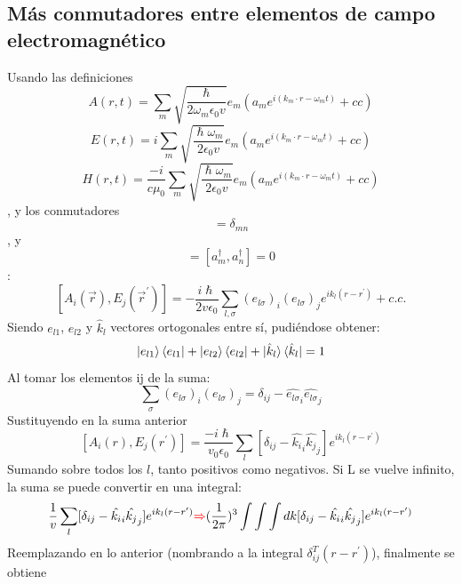 \documentclass{book}
\begin{document}
    \subsection{Más conmutadores entre elementos de campo electromagnético} Usando las definiciones 
    \begin{equation}{A(r,t)=\sum_{m}\sqrt{\frac{\hslash}{2\omega_m\epsilon_0 v}}{e}_m(a_me^{i({k}_m\cdot{r}-\omega_m t)}+cc)} \end{equation}
    \begin{equation}{E(r,t)=i\sum_{m}\sqrt{\frac{\hslash\omega_m}{2\epsilon_0 v}}{e}_m(a_me^{i({k}_m\cdot{r}-\omega_m t)}+cc)} \end{equation}
    \begin{equation}{H(r,t)=\frac{-i}{c\mu_0}\sum_{m}\sqrt{\frac{\hslash\omega_m}{2\epsilon_0 v}}{e}_m(a_me^{i({k}_m\cdot{r}-\omega_m t)}+cc)} \end{equation}
    , y los conmutadores \begin{equation}[a_m,a_n^\dag]=\delta_{mn} \end{equation}, y \begin{equation}[a_m,a_n]=[a_m^\dag, a_n^\dag]=0 \end{equation} :
    \begin{equation}{ [A_i(\vec{r}),E_j(\vec{r}^\prime)]=-\frac{i\hslash}{2v\epsilon_0}\sum_{l,\sigma}({e}_{l\sigma})_i({e}_{l\sigma})_j e^{i{k}_l({r}-{r}^\prime)}+c.c.} \end{equation}
    Siendo ${{e}_{l1}}$, ${{e}_{l2}}$ y ${\hat{{k}}_l}$  vectores ortogonales entre sí, pudiéndose obtener:
    \begin{equation}{ \ket{{e}_{l1}}\bra{{e}_{l1}}+\ket{{e}_{l2}}\bra{{e}_{l2}}+\ket{\hat{{k}}_l}\bra{\hat{{k}}_l}=1} \end{equation}
    Al tomar los elementos ij de la suma:
    \begin{equation}{ \sum_\sigma ({e}_{l\sigma})_i({e}_{l\sigma})_j=\delta_{ij}-\hat{{e}_{l\sigma}}_i\hat{{e}_{l\sigma}}_j} \end{equation} 
    Sustituyendo en la suma anterior
    \begin{equation}{ [A_i({r}), E_j({r}^\prime)]=\frac{-i\hslash}{v_0\epsilon_0}\sum_l [\delta_{ij}-\hat{{k}_{i}}_i\hat{{k}_{j}}_j]e^{i{k}_l({r}-{r}^\prime)}}\end{equation} Sumando sobre todos los ${l}$, tanto positivos como negativos. 
    Si L se vuelve infinito, la suma se puede convertir en una integral: \begin{equation}{\frac{1}{v}\sum_l [\delta_{ij}-\hat{{k}_{i}}_i\hat{{k}_{j}}_j]e^{i{k}_l({r}-{r}^\prime)}\textcolor{red}{\Rightarrow} (\frac{1}{2\pi})^3 \int \int \int d{k} [\delta_{ij}-\hat{{k}_{i}}_i\hat{{k}_{j}}_j]e^{i{k}_l({r}-{r}^\prime)}}\end{equation} Reemplazando en lo anterior (nombrando a la integral $\delta_{ij}^T({r}-{r}^\prime)$), finalmente se obtiene  
\end{document}
